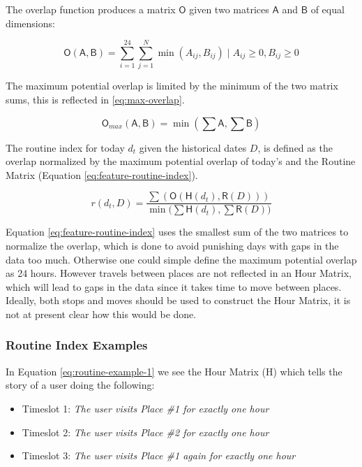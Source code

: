 The overlap function produces a matrix $\mathsf{O}$ given two matrices $\mathsf{A}$ and $\mathsf{B}$ of equal dimensions:

\begin{equation}
\label{eq:overlap-function}
    \mathsf{O}(\mathsf{A}, \mathsf{B}) = \sum_{i=1}^{24} \sum_{j=1}^{N} \min (A_{ij}, B_{ij}) \;|\; A_{ij} \geq 0, B_{ij} \geq 0
\end{equation}

The maximum potential overlap is limited by the minimum of the two matrix sums, this is reflected in \eqref{eq:max-overlap}.

\begin{equation}
\label{eq:max-overlap}
    \mathsf{O}_{max}(\mathsf{A}, \mathsf{B}) = \min (\sum \mathsf{A}, \sum \mathsf{B})
\end{equation}

The routine index for today $d_t$ given the historical dates $D$, is defined as the overlap normalized by the maximum potential overlap of today's  and the Routine Matrix (Equation \eqref{eq:feature-routine-index}).

\begin{equation}
\label{eq:feature-routine-index}
r(d_t, D) = \frac{\sum (\mathsf{O} (\mathsf{H}(d_t), \mathsf{R}(D)))}{\min \Big(\sum \mathsf{H}(d_t), \sum \mathsf{R}(D) \Big)}
\end{equation}

Equation \eqref{eq:feature-routine-index} uses the smallest sum of the two matrices to normalize the overlap, which is done to avoid punishing days with gaps in the data too much. Otherwise one could simple define the maximum potential overlap as 24 hours. However travels between places are not reflected in an Hour Matrix, which will lead to gaps in the data since it takes time to move between places. Ideally, both stops and moves should be used to construct the Hour Matrix, it is not at present clear how this would be done.  

\subsubsection*{Routine Index Examples}

In Equation \eqref{eq:routine-example-1} we see the Hour Matrix (H) which tells the story of a user doing the following:

\begin{itemize}
    \item Timeslot 1: \textit{The user visits Place \#1 for exactly one hour}
    \item Timeslot 2: \textit{The user visits Place \#2 for exactly one hour}
    \item Timeslot 3: \textit{The user visits Place \#1 again for exactly one hour}
\end{itemize}

